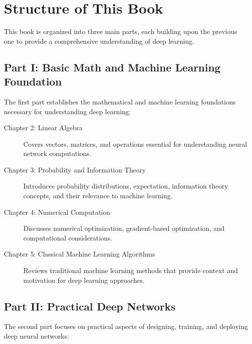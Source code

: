 
\section{Structure of This Book }
\label{sec:book-structure}

This book is organized into three main parts, each building upon the previous one to provide a comprehensive understanding of deep learning.

\subsection{Part I: Basic Math and Machine Learning Foundation}

The first part establishes the mathematical and machine learning foundations necessary for understanding deep learning:

\begin{description}
    \item[Chapter 2: Linear Algebra] Covers vectors, matrices, and operations essential for understanding neural network computations.
    
    \item[Chapter 3: Probability and Information Theory] Introduces probability distributions, expectation, information theory concepts, and their relevance to machine learning.
    
    \item[Chapter 4: Numerical Computation] Discusses numerical optimization, gradient-based optimization, and computational considerations.
    
    \item[Chapter 5: Classical Machine Learning Algorithms] Reviews traditional machine learning methods that provide context and motivation for deep learning approaches.
\end{description}

\subsection{Part II: Practical Deep Networks}

The second part focuses on practical aspects of designing, training, and deploying deep neural networks:

